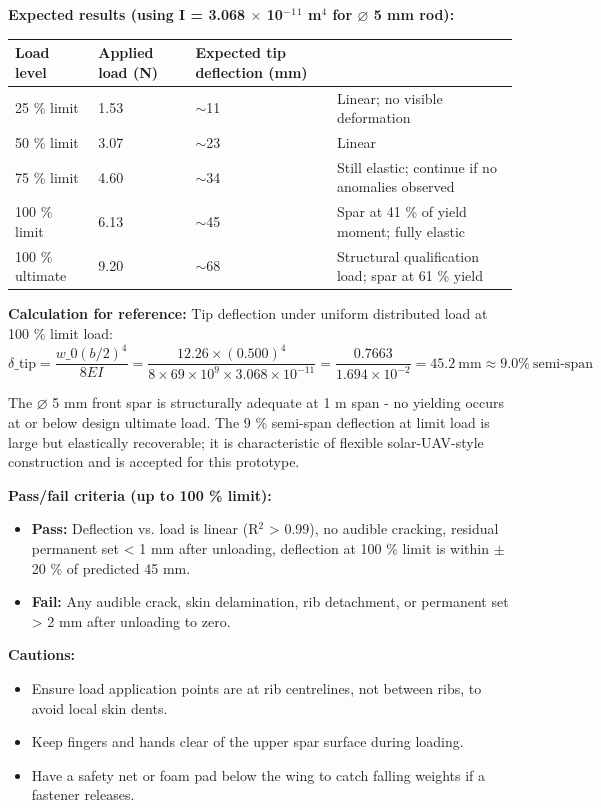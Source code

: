 \documentclass[10pt,a4paper]{article}
\begin{document}
\textbf{Expected results (using I = 3.068 ${\times}$ 10$^{-}$$^{1}$$^{1}$ m$^{4}$ for $\varnothing$ 5 mm rod):}

\begin{center}
\begin{tabularx}{\textwidth}{|l|l|l|X|}
\hline
Load level & Applied load (N) & Expected tip deflection (mm) &  \\
\hline
25 \% limit & 1.53 & $\sim$11 & Linear; no visible deformation \\
\hline
50 \% limit & 3.07 & $\sim$23 & Linear \\
\hline
75 \% limit & 4.60 & $\sim$34 & Still elastic; continue if no anomalies observed \\
\hline
100 \% limit & 6.13 & $\sim$45 & Spar at 41 \% of yield moment; fully elastic \\
\hline
100 \% ultimate & 9.20 & $\sim$68 & Structural qualification load; spar at 61 \% yield \\
\hline
\end{tabularx}
\end{center}

\textbf{Calculation for reference:} Tip deflection under uniform distributed load at 100 \% limit load:
$$\delta\_{\text{tip}} = \frac{w\_0 (b/2)^4}{8EI} = \frac{12.26 \times (0.500)^4}{8 \times 69 \times 10^9 \times 3.068 \times 10^{-11}} = \frac{0.7663}{1.694 \times 10^{-2}} = 45.2\ \text{mm} \approx 9.0\%\ \text{semi-span}$$

The $\varnothing$ 5 mm front spar is structurally adequate at 1 m span - no yielding occurs at or below design ultimate load. The 9 \% semi-span deflection at limit load is large but elastically recoverable; it is characteristic of flexible solar-UAV-style construction and is accepted for this prototype.

\textbf{Pass/fail criteria (up to 100 \% limit):}
\begin{itemize}[noitemsep,topsep=2pt]
\item \textbf{Pass:} Deflection vs. load is linear (R$^{2}$ > 0.99), no audible cracking, residual permanent set < 1 mm after unloading, deflection at 100 \% limit is within ${\pm}$20 \% of predicted 45 mm.
\item \textbf{Fail:} Any audible crack, skin delamination, rib detachment, or permanent set > 2 mm after unloading to zero.
\end{itemize}

\textbf{Cautions:}
\begin{itemize}[noitemsep,topsep=2pt]
\item Ensure load application points are at rib centrelines, not between ribs, to avoid local skin dents.
\item Keep fingers and hands clear of the upper spar surface during loading.
\item Have a safety net or foam pad below the wing to catch falling weights if a fastener releases.
\end{itemize}
\end{document}
